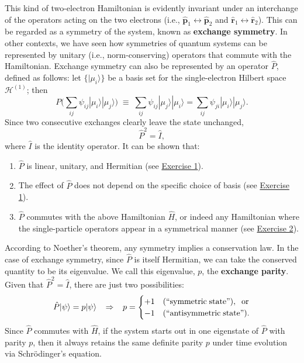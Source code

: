 \documentclass[pra,12pt]{revtex4}
\begin{document}
This kind of two-electron Hamiltonian is evidently invariant under an
interchange of the operators acting on the two electrons (i.e.,
$\hat{\mathbf{p}}_1 \leftrightarrow \hat{\mathbf{p}}_2$ and
$\hat{\mathbf{r}}_1 \leftrightarrow \hat{\mathbf{r}}_2$).  This can be
regarded as a symmetry of the system, known as \textbf{exchange
  symmetry}.  In other contexts, we have seen how symmetries of
quantum systems can be represented by unitary (i.e., norm-conserving)
operators that commute with the Hamiltonian.  Exchange symmetry can
also be represented by an operator $\hat{P}$, defined as follows: let
$\{|\mu_i\rangle\}$ be a basis set for the single-electron Hilbert
space $\mathscr{H}^{(1)}$; then
$$P \Big (\sum_{ij} \psi_{ij} |\mu_i\rangle|\mu_j\rangle \Big)
\;\equiv\;  \sum_{ij} \psi_{ij} |\mu_j\rangle|\mu_i\rangle = \sum_{ij} \psi_{ji} |\mu_i\rangle|\mu_j\rangle.$$
Since two consecutive exchanges clearly leave the state unchanged,
$$\hat{P}^2 = \hat{I},$$
where $\hat{I}$ is the identity operator.  It can be shown that:
\begin{enumerate}
\item $\hat{P}$ is linear, unitary, and Hermitian (see
  \hyperref[ex:1]{Exercise 1}).
  
\item The effect of $\hat{P}$ does not depend on the specific choice
  of basis (see \hyperref[ex:1]{Exercise 1}).

\item $\hat{P}$ commutes with the above Hamiltonian $\hat{H}$, or
  indeed any Hamiltonian where the single-particle operators appear in
  a symmetrical manner (see \hyperref[ex:2]{Exercise 2}).
\end{enumerate}

According to Noether's theorem, any symmetry implies a conservation
law.  In the case of exchange symmetry, since $\hat{P}$ is itself
Hermitian, we can take the conserved quantity to be its eigenvalue.
We call this eigenvalue, $p$, the \textbf{exchange parity}.  Given
that $\hat{P}^2 = \hat{I}$, there are just two possibilities:
$$\hat{P} |\psi\rangle = p|\psi\rangle \;\;\;\Rightarrow\;\;\; p = \begin{cases}+1 & \textrm{(``symmetric\;state'')}, \;\;\textrm{or} \\ -1 & \textrm{(``antisymmetric\;state'').}\end{cases}$$
Since $\hat{P}$ commutes with $\hat{H}$, if the system starts out in
one eigenstate of $\hat{P}$ with parity $p$, then it always retains
the same definite parity $p$ under time evolution via Schr\"odinger's
equation.
\end{document}
